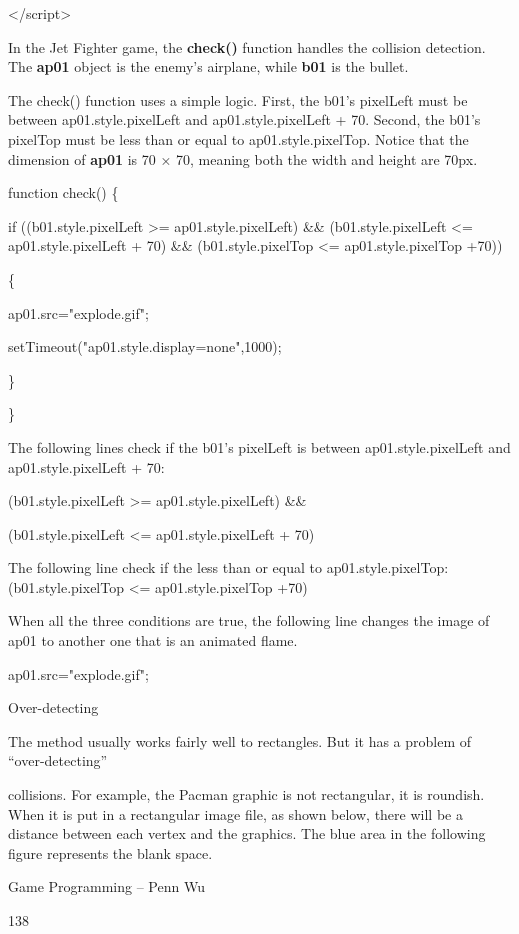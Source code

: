 \documentclass[
]{article}
\begin{document}
\textless/script\textgreater{}

In the Jet Fighter game, the \textbf{check()} function handles the
collision detection. The \textbf{ap01} object is the enemy's airplane,
while \textbf{b01} is the bullet.

The check() function uses a simple logic. First, the b01's pixelLeft
must be between ap01.style.pixelLeft and ap01.style.pixelLeft + 70.
Second, the b01's pixelTop must be less than or equal to
ap01.style.pixelTop. Notice that the dimension of \textbf{ap01} is 70 ×
70, meaning both the width and height are 70px.

function check() \{

if ((b01.style.pixelLeft \textgreater= ap01.style.pixelLeft) \&\&
(b01.style.pixelLeft \textless= ap01.style.pixelLeft + 70) \&\&
(b01.style.pixelTop \textless= ap01.style.pixelTop +70))

\{

ap01.src="explode.gif";

setTimeout("ap01.style.display=\textquotesingle none\textquotesingle",1000);

\}

\}

The following lines check if the b01's pixelLeft is between
ap01.style.pixelLeft and ap01.style.pixelLeft + 70:

(b01.style.pixelLeft \textgreater= ap01.style.pixelLeft) \&\&

(b01.style.pixelLeft \textless= ap01.style.pixelLeft + 70)

The following line check if the less than or equal to
ap01.style.pixelTop: (b01.style.pixelTop \textless= ap01.style.pixelTop
+70)

When all the three conditions are true, the following line changes the
image of ap01 to another one that is an animated flame.

ap01.src="explode.gif"; \textbf{}

Over-detecting

The method usually works fairly well to rectangles. But it has a problem
of ``over-detecting''

collisions. For example, the Pacman graphic is not rectangular, it is
roundish. When it is put in a rectangular image file, as shown below,
there will be a distance between each vertex and the graphics. The blue
area in the following figure represents the blank space.

Game Programming -- Penn Wu

138
\end{document}
